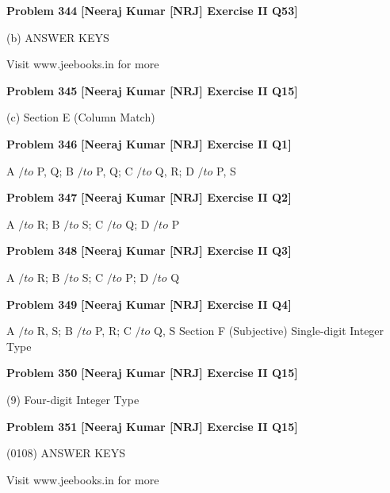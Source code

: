 \begin{problembox}
\textbf{Problem 344} \hfill \textbf{[Neeraj Kumar [NRJ] Exercise II Q53]}
\label{q:ext-nrj_all_questions-344}

(b)
ANSWER KEYS
 
 
Visit www.jeebooks.in for more
\end{problembox}

\begin{problembox}
\textbf{Problem 345} \hfill \textbf{[Neeraj Kumar [NRJ] Exercise II Q15]}
\label{q:ext-nrj_all_questions-345}

(c)
Section E (Column Match)
\end{problembox}

\begin{problembox}
\textbf{Problem 346} \hfill \textbf{[Neeraj Kumar [NRJ] Exercise II Q1]}
\label{q:ext-nrj_all_questions-346}

A $/to$ P, Q; B $/to$ P, Q; C $/to$ Q, R; D $/to$ P, S
\end{problembox}

\begin{problembox}
\textbf{Problem 347} \hfill \textbf{[Neeraj Kumar [NRJ] Exercise II Q2]}
\label{q:ext-nrj_all_questions-347}

A $/to$ R; B $/to$ S; C $/to$ Q; D $/to$ P
\end{problembox}

\begin{problembox}
\textbf{Problem 348} \hfill \textbf{[Neeraj Kumar [NRJ] Exercise II Q3]}
\label{q:ext-nrj_all_questions-348}

A $/to$ R; B $/to$ S; C $/to$ P; D $/to$ Q
\end{problembox}

\begin{problembox}
\textbf{Problem 349} \hfill \textbf{[Neeraj Kumar [NRJ] Exercise II Q4]}
\label{q:ext-nrj_all_questions-349}

A $/to$ R, S; B $/to$ P, R; C $/to$ Q, S
Section F (Subjective)
Single-digit Integer Type
\end{problembox}

\begin{problembox}
\textbf{Problem 350} \hfill \textbf{[Neeraj Kumar [NRJ] Exercise II Q15]}
\label{q:ext-nrj_all_questions-350}

(9)
Four-digit Integer Type
\end{problembox}

\begin{problembox}
\textbf{Problem 351} \hfill \textbf{[Neeraj Kumar [NRJ] Exercise II Q15]}
\label{q:ext-nrj_all_questions-351}

(0108)
ANSWER KEYS
 
 
Visit www.jeebooks.in for more
\end{problembox}

